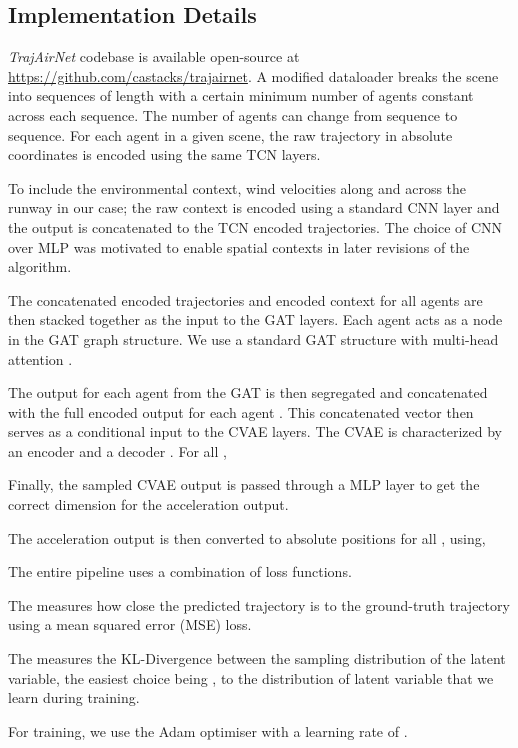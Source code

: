 \documentclass[letterpaper, 10 pt, conference]{ieeeconf}
\begin{document}
\subsection{Implementation Details}\label{sec:implement}
\textit{TrajAirNet} codebase is available open-source at \href{https://github.com/castacks/trajairnet}{https://github.com/castacks/trajairnet}. A modified dataloader breaks the scene into sequences of length  with a certain minimum number of agents constant across each sequence. The number of agents can change from sequence to sequence. For each agent in a given scene, the raw trajectory in absolute coordinates is encoded using the same TCN layers. 

To include the environmental context, wind velocities along and across the runway in our case; the raw context is encoded using a standard CNN layer and the output is concatenated to the TCN encoded trajectories. The choice of CNN over MLP was motivated to enable spatial contexts in later revisions of the algorithm.  

The concatenated encoded trajectories and encoded context for all agents are then stacked together as the input to the GAT layers. Each agent acts as a node in the GAT graph structure. We use a standard GAT structure with multi-head attention \cite{velivckovic2017graph}.  

The output for each agent from the GAT is then segregated and concatenated with the full encoded output  for each agent . This concatenated vector then serves as a conditional input to the CVAE layers. The CVAE is characterized by an encoder  and a  decoder . For all ,

Finally, the sampled CVAE output is passed through a MLP layer to get the correct dimension for the acceleration output. 

The acceleration output is then converted to absolute positions for all , using, 


The entire pipeline uses a combination of loss functions. 


The  measures how close the predicted trajectory is to the ground-truth trajectory using a mean squared error (MSE) loss.

The  measures the KL-Divergence between the sampling distribution of the latent variable, the easiest choice being , to the distribution of latent variable that we learn during training.


For training, we use the Adam optimiser with a learning rate of .
\end{document}

